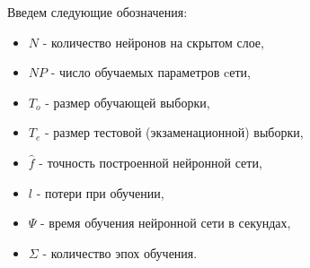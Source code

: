 \bigskip

Введем следующие обозначения:
\begin{itemize}
	\item $N$ - количество нейронов на скрытом слое,
	\item $NP$ - число обучаемых параметров cети, 
	\item $T_o$ - размер обучающей выборки,
	\item $T_e$ - размер тестовой (экзаменационной) выборки,
	\item $\hat{f}$ - точность построенной нейронной сети,
	\item $l$ - потери при обучении,
	\item $\Psi$ - время обучения нейронной сети в секундах,
	\item $\Sigma$ - количество эпох обучения.
\end{itemize}

